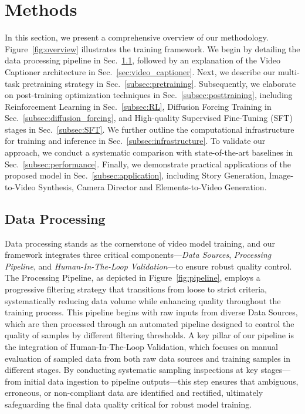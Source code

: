 \documentclass{article}
\begin{document}
\section{Methods}
\label{sec:headings}
In this section, we present a comprehensive overview of our methodology. Figure~\ref{fig:overview} illustrates the training framework. We begin by detailing the data processing pipeline in Sec.~\ref{sec:data_processing}, followed by an explanation of the Video Captioner architecture in Sec.~\ref{sec:video_captioner}. Next, we describe our multi-task pretraining strategy in Sec.~\ref{subsec:pretraining}. Subsequently, we elaborate on post-training optimization techniques in Sec.~\ref{subsec:posttraining}, including Reinforcement Learning in Sec.~\ref{subsec:RL}, Diffusion Forcing Training in Sec.~\ref{subsec:diffusion_forcing}, and High-quality Supervised Fine-Tuning (SFT) stages in Sec.~\ref{subsec:SFT}. We further outline the computational infrastructure for training and inference in Sec.~\ref{subsec:infrastructure}. To validate our approach, we conduct a systematic comparison with state-of-the-art baselines in Sec.~\ref{subsec:performance}. Finally, we demonstrate practical applications of the proposed model in Sec.~\ref{subsec:application}, including Story Generation, Image-to-Video Synthesis, Camera Director and Elements-to-Video Generation.
\subsection{Data Processing}
\label{sec:data_processing}

Data processing stands as the cornerstone of video model training, and our framework integrates three critical components—\emph{Data Sources}, \emph{Processing Pipeline}, and \emph{Human-In-The-Loop Validation}—to ensure robust quality control. The Processing Pipeline, as depicted in Figure~\ref{fig:pipeline}, employs a progressive filtering strategy that transitions from loose to strict criteria, systematically reducing data volume while enhancing quality throughout the training process. This pipeline begins with raw inputs from diverse Data Sources, which are then processed through an automated pipeline designed to control the quality of samples by different filtering thresholds.
A key pillar of our pipeline is the integration of Human-In-The-Loop Validation, which focuses on manual evaluation of sampled data from both raw data sources and training samples in different stages. By conducting systematic sampling inspections at key stages—from initial data ingestion to pipeline outputs—this step ensures that ambiguous, erroneous, or non-compliant data are identified and rectified, ultimately safeguarding the final data quality critical for robust model training.
\end{document}
